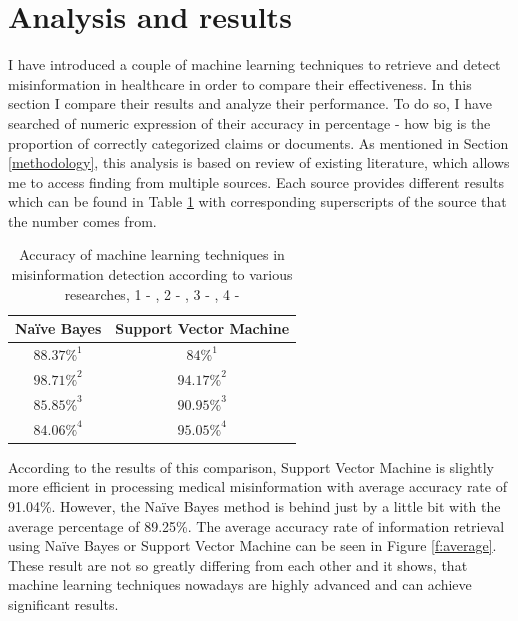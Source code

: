 \documentclass[11pt ,english,a4paper]{article}
\begin{document}
\section{Analysis and results}\label{analysis}
I have introduced a couple of machine learning techniques to retrieve and detect misinformation in healthcare in order to compare their effectiveness. In this section I compare their results and analyze their performance. To do so, I have searched of numeric expression of their accuracy in percentage - how big is the proportion of correctly categorized claims or documents. As mentioned in Section \ref{methodology}, this analysis is based on review of existing literature, which allows me to access finding from multiple sources. Each source provides different results which can be found in Table \ref{table:results} with corresponding superscripts of the source that the number comes from. 

\begin{table}[H]
\centering
\begin{tabular}{||c c||} 
 \hline
Naïve Bayes & Support Vector Machine\\ [0.5ex] 
 \hline\hline
 $88.37\%^{1}$ & $84\%^{1}$  \\
 \hline
 $98.71\%^{2}$ & $94.17\%^{2}$  \\
 \hline
 $85.85\%^{3}$ & $90.95\%^{3}$  \\
 \hline
 $84.06\%^{4}$ & $95.05\%^{4}$  \\ [1ex]
 \hline
\end{tabular}
\caption{\centering Accuracy of machine learning techniques in misinformation detection according to various researches, 1 - \cite{chap22unmask}, 2 - \cite{bar21health}, 3 - \cite{pod19mach}, 4 - \cite{sha20mach}}
\label{table:results}
\end{table}

According to the results of this comparison, Support Vector Machine is slightly more efficient in processing medical misinformation with average accuracy rate of 91.04\%. However, the Naïve Bayes method is behind just by a little bit with the average percentage of 89.25\%. The average accuracy rate of information retrieval using Naïve Bayes or Support Vector Machine can be seen in Figure \ref{f:average}. These result are not so greatly differing from each other and it shows, that machine learning techniques nowadays are highly advanced and can achieve significant results.
\end{document}
